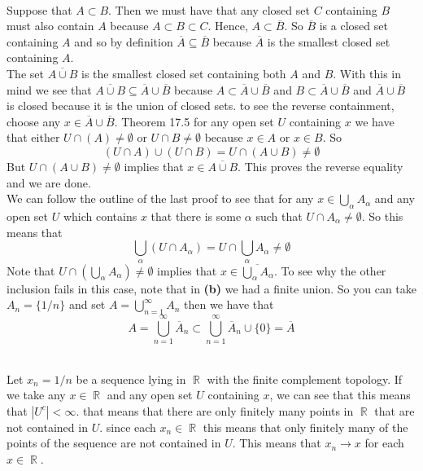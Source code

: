 \documentclass{article}
\DeclareMathOperator{\R}{\mathbb{R}}
\newcommand{\problem}[1]{\noindent{\textbf{Problem #1}}\\}
\newcommand{\problempart}[1]{\noindent{\textbf{(#1)}}}
\begin{document}
\problem{17.6}
\problempart{a} Suppose that $A \subset B$. Then we must have that any closed set $C$ containing $B$ must also contain $A$ because $A \subset B \subset C$. Hence, $A \subset \overline{B}$. So $\overline{B}$ is a closed set containing $A$ and so by definition $\overline{A} \subseteq \overline{B}$ because $\overline{A}$ is the smallest closed set containing $A$. \\

\problempart{b}  The set $\overline{A \cup B}$ is the smallest closed set containing both $A$ and $B$. With this in mind we see that $\overline{A \cup B} \subseteq \overline{A} \cup \overline{B}$ because $A \subset \overline{A} \cup \overline{B}$ and $B \subset \overline{A} \cup \overline{B}$ and $\overline{A} \cup \overline{B}$ is closed because it is the union of closed sets. to see the reverse containment, choose any $x \in \overline{A} \cup \overline{B}$. Theorem 17.5 for any open set $U$ containing $x$ we have that either $ U \cap (A) \neq \emptyset$ or $U \cap B \neq \emptyset$ because $x \in A$ or $x \in B$. So
\[
(U \cap A) \cup (U\cap B) = U \cap (A \cup B) \neq \emptyset
\]
But $U \cap (A \cup B) \neq \emptyset$ implies that $x \in \overline{A \cup B}$. This proves the reverse equality and we are done. \\

\problempart{c} We can follow the outline of the last proof to see that for any $x \in \bigcup_\alpha A_\alpha$ and any open set $U$ which contains $x$ that there is some $\alpha$ such that $U \cap A_\alpha \neq \emptyset$. So this means that 
\[
\bigcup_\alpha (U \cap A_\alpha) = U \cap \bigcup_\alpha A_\alpha \neq \emptyset  
\]
Note that $ U \cap \left(\bigcup_\alpha A_\alpha\right) \neq \emptyset$ implies that $x \in \overline{\bigcup_\alpha A_\alpha}$. To see why the other inclusion fails in this case, note that in {\bf (b)} we had a finite union. So you can take $A_n = \{1/n\}$ and set $A = \bigcup_{n=1}^\infty A_n$ then we have that 
\[
A = \bigcup_{n=1}^\infty \overline{A}_n \subset \bigcup_{n=1}^\infty \overline{A}_n \cup \{0\} = \overline{A}
\]

\problem{17.14} Let $x_n = 1/n$ be a sequence lying in $\R$ with the finite complement topology. If we take any $x \in \R$ and any open set $U$ containing $x$, we can see that this means that $|U^c| < \infty$. that means that there are only finitely many points in $\R$ that are not contained in $U$. since each $x_n \in \R$ this means that only finitely many of the points of the sequence are not contained in $U$. This means that $x_n \to x$ for each $x \in \R$.  
\end{document}
